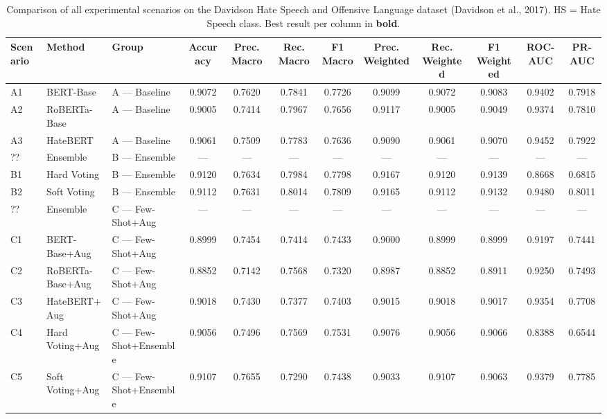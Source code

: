 \begin{table}[htbp]
\centering
\caption{Comparison of all experimental scenarios on the Davidson Hate Speech and Offensive Language dataset (Davidson et al., 2017). HS = Hate Speech class. Best result per column in \textbf{bold}.}
\label{tab:main_results}
\small
\setlength{\tabcolsep}{4pt}
\renewcommand{\arraystretch}{1.2}
\begin{tabular}{lllccccccccc}
\toprule
\textbf{Scenario} & \textbf{Method} & \textbf{Group} & \textbf{Accuracy} & \textbf{Prec. Macro} & \textbf{Rec. Macro} & \textbf{F1 Macro} & \textbf{Prec. Weighted} & \textbf{Rec. Weighted} & \textbf{F1 Weighted} & \textbf{ROC-AUC} & \textbf{PR-AUC} \\
\midrule
A1 & BERT-Base & A — Baseline & 0.9072 & 0.7620 & 0.7841 & 0.7726 & 0.9099 & 0.9072 & 0.9083 & 0.9402 & 0.7918 \\
A2 & RoBERTa-Base & A — Baseline & 0.9005 & 0.7414 & 0.7967 & 0.7656 & 0.9117 & 0.9005 & 0.9049 & 0.9374 & 0.7810 \\
A3 & HateBERT & A — Baseline & 0.9061 & 0.7509 & 0.7783 & 0.7636 & 0.9090 & 0.9061 & 0.9070 & 0.9452 & 0.7922 \\
\midrule
?? & Ensemble & B — Ensemble & — & — & — & — & — & — & — & — & — \\
B1 & Hard Voting & B — Ensemble & 0.9120 & 0.7634 & 0.7984 & 0.7798 & 0.9167 & 0.9120 & 0.9139 & 0.8668 & 0.6815 \\
B2 & Soft Voting & B — Ensemble & 0.9112 & 0.7631 & 0.8014 & 0.7809 & 0.9165 & 0.9112 & 0.9132 & 0.9480 & 0.8011 \\
\midrule
?? & Ensemble & C — Few-Shot+Aug & — & — & — & — & — & — & — & — & — \\
C1 & BERT-Base+Aug & C — Few-Shot+Aug & 0.8999 & 0.7454 & 0.7414 & 0.7433 & 0.9000 & 0.8999 & 0.8999 & 0.9197 & 0.7441 \\
C2 & RoBERTa-Base+Aug & C — Few-Shot+Aug & 0.8852 & 0.7142 & 0.7568 & 0.7320 & 0.8987 & 0.8852 & 0.8911 & 0.9250 & 0.7493 \\
C3 & HateBERT+Aug & C — Few-Shot+Aug & 0.9018 & 0.7430 & 0.7377 & 0.7403 & 0.9015 & 0.9018 & 0.9017 & 0.9354 & 0.7708 \\
\midrule
C4 & Hard Voting+Aug & C — Few-Shot+Ensemble & 0.9056 & 0.7496 & 0.7569 & 0.7531 & 0.9076 & 0.9056 & 0.9066 & 0.8388 & 0.6544 \\
C5 & Soft Voting+Aug & C — Few-Shot+Ensemble & 0.9107 & 0.7655 & 0.7290 & 0.7438 & 0.9033 & 0.9107 & 0.9063 & 0.9379 & 0.7785 \\
\bottomrule
\end{tabular}
\end{table}